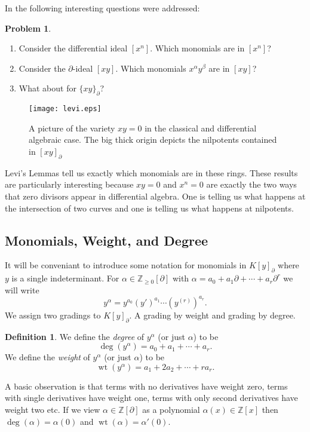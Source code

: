 \documentclass[12pt]{book}
\numberwithin{equation}{section}
\theoremstyle{definition}
\newtheorem{problem}[theorem]{Problem}
\newtheorem{definition}[theorem]{Definition}
\theoremstyle{remark}
\newcommand{\ZZ}{\mathbb{Z}}
\newcommand{\wt}{\operatorname{wt}}
\begin{document}
In \cite{Levi1942} the following interesting questions were addressed:
\begin{problem}
	\begin{enumerate}
		\item Consider the differential ideal $[x^n]$.
		Which monomials  are in $[x^n]$? 
		\item Consider the $\partial$-ideal $[xy]$. 
		Which monomials $x^{\alpha}y^{\beta}$ are in $[xy]$?
		\item What about for $\lbrace xy \rbrace_{\partial}$?
	\end{enumerate}
\end{problem}

\begin{figure}[h]
	\begin{center}
		\texttt{[image: levi.eps]}
	\end{center}
	\caption{A picture of the variety $xy=0$ in the classical and differential algebraic case. 
		The big thick origin depicts the nilpotents contained in $[xy]_{\partial}$}
\end{figure}
Levi's Lemmas tell us exactly which monomials are in these rings. 
These results are particularly interesting because $xy=0$ and $x^n=0$ are exactly the two ways that zero divisors appear in differential algebra. 
One is telling us what happens at the intersection of two curves and one is telling us what happens at nilpotents.

\subsection{Monomials, Weight, and Degree}
It will be conveniant to introduce some notation for monomials in $K[ y ]_{\partial}$ where $y$ is a single indeterminant. 
For $\alpha \in \ZZ_{\geq 0}[\partial]$ with $\alpha = a_0 + a_1 \partial + \cdots + a_r \partial^r$ we will write 
$$ y^{\alpha} = y^{a_0} (y')^{a_1} \cdots (y^{(r)})^{a_r}.$$
We assign two gradings to $K[y]_{\partial}$. 
A grading by weight and grading by degree. 
\begin{definition}
We define the \emph{degree} of $y^{\alpha}$ (or just $\alpha$) to be 
$$\deg(y^{\alpha}) = a_0 + a_1 + \cdots + a_r.$$
We define the \emph{weight} of $y^{\alpha}$ (or just $\alpha$) to be
$$ \wt(y^{\alpha}) = a_1 + 2a_2 + \cdots + r a_r.$$
\end{definition}
A basic observation is that terms with no derivatives have weight zero, terms with single derivatives have weight one, terms with only second derivatives have weight two etc. 
If we view $\alpha \in \ZZ[\partial]$ as a polynomial $\alpha(x) \in \ZZ[x]$ then $\deg(\alpha) = \alpha(0)$ and $\wt(\alpha) = \alpha'(0)$. 
\end{document}
